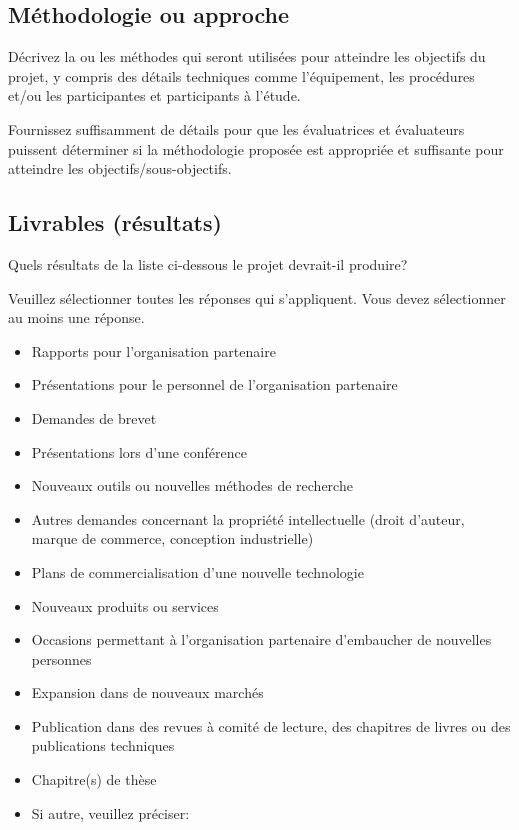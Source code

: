 \documentclass{mitacs-acceleration}
\begin{document}

\toportrait %

\subsection{Méthodologie ou approche} %

\begin{instructions}
Décrivez la ou les méthodes qui seront utilisées pour atteindre les objectifs du projet, y compris des détails techniques comme l'équipement, les procédures et/ou les participantes et participants à l'étude. 

Fournissez suffisamment de détails pour que les évaluatrices et évaluateurs puissent déterminer si la méthodologie proposée est appropriée et suffisante pour atteindre les objectifs/sous-objectifs.
\end{instructions}


\subsection{Livrables (résultats)} %

\begin{instructions}
Quels résultats de la liste ci-dessous le projet devrait-il produire?

Veuillez sélectionner toutes les réponses qui s'appliquent. Vous devez sélectionner au moins une réponse.
\end{instructions}

\begin{itemize}[label=$\boxempty$]
\item Rapports pour l'organisation partenaire
\item Présentations pour le personnel de l'organisation partenaire  
\item Demandes de brevet  
\item Présentations lors d'une conférence 
\item Nouveaux outils ou nouvelles méthodes de recherche 
\item Autres demandes concernant la propriété intellectuelle (droit d'auteur, marque de commerce, conception industrielle) 
\item Plans de commercialisation d'une nouvelle technologie     
\item Nouveaux produits ou services   
\item Occasions permettant à l'organisation partenaire d'embaucher de nouvelles personnes  
\item Expansion dans de nouveaux marchés 
\item Publication dans des revues à comité de lecture, des chapitres de livres ou des publications techniques  
\item Chapitre(s) de thèse 
\item Si autre, veuillez préciser:
\end{itemize}
\end{document}
